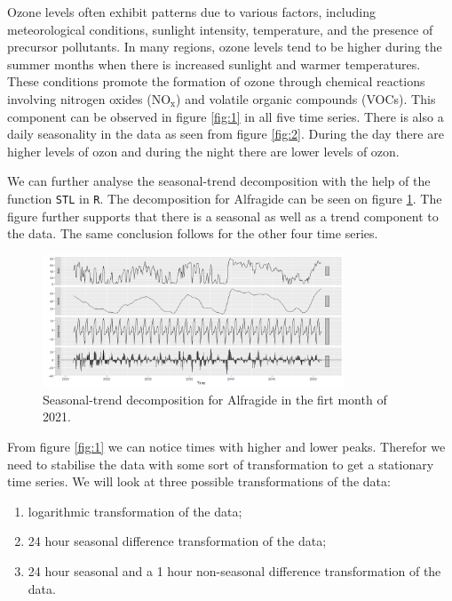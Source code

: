 \documentclass{article}
\begin{document}
Ozone levels often exhibit patterns due to various factors, including meteorological conditions, sunlight intensity, temperature, and the presence of precursor pollutants. In many regions, ozone levels tend to be higher during the summer months when there is increased sunlight and warmer temperatures. These conditions promote the formation of ozone through chemical reactions involving nitrogen oxides ($\text{NO}_\text{x}$) and volatile organic compounds (VOCs). This component can be observed in figure \ref{fig:1} in all five time series. There is also a daily seasonality in the data as seen from figure \ref{fig:2}. During the day there are higher levels of ozon and during the night there are lower levels of ozon. 

We can further analyse the seasonal-trend decomposition  with the help of the function \verb|STL| in \verb|R|. The decomposition for Alfragide can be seen on figure \ref{fig:std}. The figure further supports that there is a seasonal as well as a trend component to the data. The same conclusion follows for the other four time series. 

\begin{figure}[ht!]
    \centering
    \includegraphics[width=0.80\textwidth]{Plots1/eda7.png}
    \caption{Seasonal-trend decomposition for Alfragide in the firt month of 2021.}
    \label{fig:std}
\end{figure}

From figure \ref{fig:1} we can notice times with higher and lower peaks. Therefor we need to stabilise the data with some sort of transformation to get a stationary time series. We will look at three possible transformations of the data:
\begin{enumerate}
    \item logarithmic transformation of the data;
    \item 24 hour seasonal difference transformation of the data;
    \item 24 hour seasonal and a 1 hour non-seasonal difference transformation of the data.
\end{enumerate}
\end{document}
